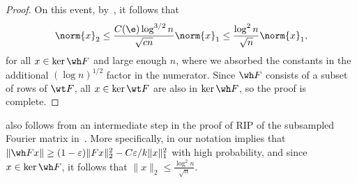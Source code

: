 \begin{proof}
    On this event, by~, it follows that
    \begin{equation}
         \norm{x}_2 \leq \frac{C(\e)\log^{3/2} n}{\sqrt{cn}} \norm{x}_1 \leq \frac{\log^2 n}{\sqrt{n}} \norm{x}_1,
    \end{equation}
    for all \(x \in \ker \wh F\) and large enough $n$, where we absorbed the constants in the additional $(\log n)^{1/2}$ factor in the numerator. Since $\wh F$ consists of a subset of rows of $\wt F$, all \(x \in \ker \wt F\) are also in \(\ker \wh F\), so the proof is complete. 
\end{proof}

\begin{remark}
 also follows from an intermediate step in the proof of RIP of the subsampled Fourier matrix in~\cite{haviv2017restricted}. More specifically, in our notation \cite[Theorem~3.1]{haviv2017restricted} implies that $\|\wh F x\| \ge (1 - \varepsilon) \| F x\|^2_2 - C \varepsilon / k \| x \|_1^2$ with high probability, and since $x \in \ker \wh F$, it follows that $\|x\|_2 \le \frac{ \log^{2}n}{\sqrt{n}}$.
\end{remark}

